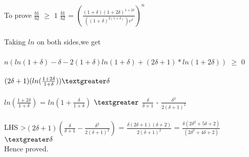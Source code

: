 \documentclass{article}
\begin{document}
To prove $\frac{b1}{b2}$ $\geq$ $1$
$\frac{b1}{b2}$ = $(\frac{(1+\delta)(1+2\delta)^{1+2\delta}}{((1+\delta)^{2(1+\delta)})e^{\delta}})^{n}$ \\\\
Taking $ln$ on both sides,we get \\\\
$n(ln(1+\delta) - \delta - 2(1+\delta)ln(1+\delta) + (2\delta + 1)*ln(1+2\delta))$ $\geq$ 0 \\\\
$(2\delta + 1)(ln(\frac{1 + 2\delta}{1 + \delta})) \textgreater \delta$ \\\\
$ln(\frac{1 + 2\delta}{1 + \delta})$ = $ln(1+\frac{\delta}{1+\delta})$ $\textgreater$ $\frac{\delta}{\delta + 1}$ - $\frac{\delta^{2}}{2(\delta + 1)^{2}}$ \\\\
LHS \textgreater $(2\delta + 1)(\frac{\delta}{\delta + 1} - \frac{\delta^{2}}{2(\delta + 1)^{2}})$
= $\frac{\delta(2\delta + 1)(\delta + 2)}{2(\delta + 1)^{2}}$
= $\frac{\delta(2\delta^{2} + 5\delta + 2)}{(2\delta^{2} + 4\delta + 2)}$
$\textgreater \delta $ \\
Hence proved. \\\\
\end{document}
